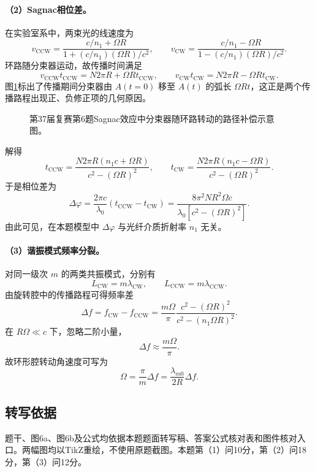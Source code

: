 \paragraph{（2）Sagnac相位差。}
在实验室系中，两束光的线速度为
\[
v_{\mathrm{CCW}}=
\frac{c/n_1+\Omega R}{1+(c/n_1)(\Omega R)/c^2},
\qquad
v_{\mathrm{CW}}=
\frac{c/n_1-\Omega R}{1-(c/n_1)(\Omega R)/c^2}.
\]
环路随分束器运动，故传播时间满足
\[
v_{\mathrm{CCW}}t_{\mathrm{CCW}}=N2\pi R+\Omega Rt_{\mathrm{CCW}},
\qquad
v_{\mathrm{CW}}t_{\mathrm{CW}}=N2\pi R-\Omega Rt_{\mathrm{CW}}.
\]
图\ref{fig:cpho37q06sagnac}标出了传播期间分束器由 $A(t=0)$ 移至 $A(t)$ 的弧长 $\Omega Rt$，这正是两个传播路程出现正、负修正项的几何原因。
\begin{figure}[htbp]\centering

\caption{第37届复赛第6题Sagnac效应中分束器随环路转动的路径补偿示意图。}\label{fig:cpho37q06sagnac}
\end{figure}
解得
\[
\boxed{t_{\mathrm{CCW}}=
\frac{N2\pi R(n_1c+\Omega R)}{c^2-(\Omega R)^2},\qquad
t_{\mathrm{CW}}=
\frac{N2\pi R(n_1c-\Omega R)}{c^2-(\Omega R)^2}.}
\]
于是相位差为
\[
\boxed{\Delta\varphi=
\frac{2\pi c}{\lambda_0}(t_{\mathrm{CCW}}-t_{\mathrm{CW}})
=\frac{8\pi^2NR^2\Omega c}{\lambda_0[c^2-(\Omega R)^2]}.}
\]
由此可见，在本题模型中 $\Delta\varphi$ 与光纤介质折射率 $n_1$ 无关。

\paragraph{（3）谐振模式频率分裂。}
对同一级次 $m$ 的两类共振模式，分别有
\[
L_{\mathrm{CW}}=m\lambda_{\mathrm{CW}},\qquad
L_{\mathrm{CCW}}=m\lambda_{\mathrm{CCW}}.
\]
由旋转腔中的传播路程可得频率差
\[
\Delta f=f_{\mathrm{CW}}-f_{\mathrm{CCW}}
=\frac{m\Omega}{\pi}
\frac{c^2-(\Omega R)^2}{c^2-(n_1\Omega R)^2}.
\]
在 $R\Omega\ll c$ 下，忽略二阶小量，
\[
\Delta f\approx\frac{m\Omega}{\pi}.
\]
故环形腔转动角速度可写为
\[
\boxed{\Omega=\frac\pi m\Delta f
=\frac{\lambda_{m0}}{2R}\Delta f.}
\]

\subsection{转写依据}
题干、图6a、图6b及公式均依据本题题面转写稿、答案公式核对表和图件核对入口。两幅图均以TikZ重绘，不使用原题截图。本题第（1）问10分，第（2）问18分，第（3）问12分。
